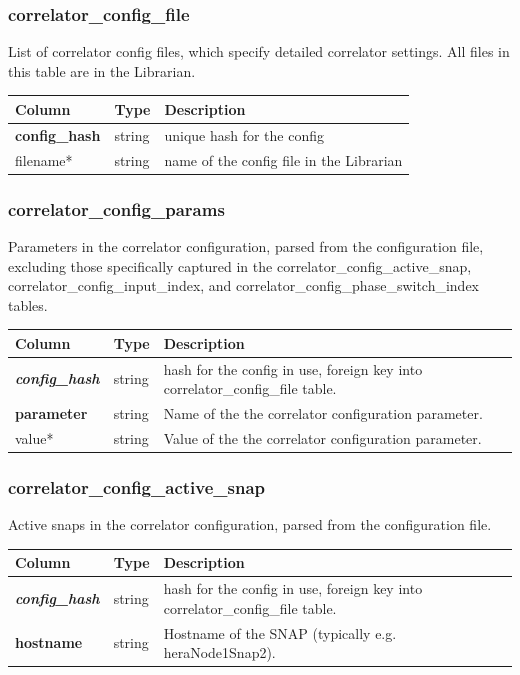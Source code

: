 \documentclass{article}
\begin{document}
{\subsubsection{correlator\_config\_file}
List of correlator config files, which specify detailed correlator settings. All files in this table are in the Librarian.
\begin{center}
 \begin{tabular}{| p{4cm} | p{2cm} | p{10cm} |}
\hline
 {\bf Column} & {\bf Type}  & {\bf Description} \\ [0.5ex]  \hline\hline
\textbf{config\_hash} & string & unique hash for the config\\ \hline
filename* & string & name of the config file in the Librarian \\\hline
\end{tabular}
\end{center}

\subsubsection{correlator\_config\_params}
Parameters in the correlator configuration, parsed from the configuration file, excluding those specifically captured in the correlator\_config\_active\_snap, correlator\_config\_input\_index, and correlator\_config\_phase\_switch\_index tables.
\begin{center}
 \begin{tabular}{| p{4cm} | p{2cm} | p{10cm} |}
\hline
 {\bf Column} & {\bf Type}  & {\bf Description} \\ [0.5ex]  \hline\hline
\textbf{\textit{config\_hash}} & string & hash for the config in use, foreign key into correlator\_config\_file table.\\ \hline
\textbf{parameter} & string & Name of the the correlator configuration parameter. \\ \hline
value* & string & Value of the the correlator configuration parameter. \\ \hline
\end{tabular}
\end{center}

\subsubsection{correlator\_config\_active\_snap}
Active snaps in the correlator configuration, parsed from the configuration file.
\begin{center}
 \begin{tabular}{| p{4cm} | p{2cm} | p{10cm} |}
\hline
 {\bf Column} & {\bf Type}  & {\bf Description} \\ [0.5ex]  \hline\hline
\textbf{\textit{config\_hash}} & string & hash for the config in use, foreign key into correlator\_config\_file table.\\ \hline
\textbf{hostname} & string & Hostname of the SNAP (typically e.g. heraNode1Snap2). \\ \hline
\end{tabular}
\end{center}

}
\end{document}
